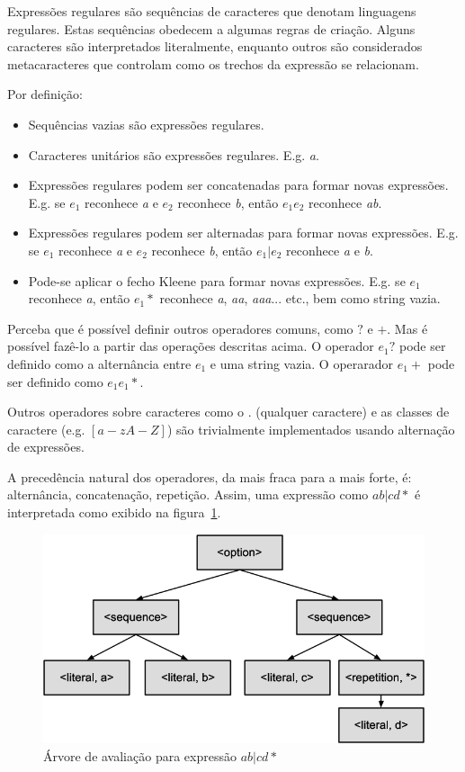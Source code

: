 \documentclass[a4paper,12pt,oneside,onecolumn]{uerj}
\begin{document}
Expressões regulares são sequências de caracteres que denotam linguagens regulares. Estas sequências obedecem a algumas regras de criação. Alguns caracteres são interpretados literalmente, enquanto outros são considerados metacaracteres que controlam como os trechos da expressão se relacionam.

Por definição:

\begin{itemize}
    \item Sequências vazias são expressões regulares.
    \item Caracteres unitários são expressões regulares. E.g. \emph{a}.
    \item Expressões regulares podem ser concatenadas para formar novas expressões. E.g. se $e_1$ reconhece \emph{a} e $e_2$ reconhece \emph{b}, então $e_1e_2$ reconhece \emph{ab}.
    \item Expressões regulares podem ser alternadas para formar novas expressões. E.g. se $e_1$ reconhece \emph{a} e $e_2$ reconhece \emph{b}, então $e_1|e_2$ reconhece \emph{a} e \emph{b}.
    \item Pode-se aplicar o fecho Kleene para formar novas expressões. E.g. se $e_1$ reconhece \emph{a}, então $e_1*$ reconhece \emph{a}, \emph{aa}, \emph{aaa}... etc., bem como string vazia.
\end{itemize}

Perceba que é possível definir outros operadores comuns, como $?$ e $+$. Mas é possível fazê-lo a partir das operações descritas acima. O operador $e_1?$ pode ser definido como a alternância entre $e_1$ e uma string vazia. O operarador $e_1+$ pode ser definido como $e_1e_1*$.

Outros operadores sobre caracteres como o $.$ (qualquer caractere) e as classes de caractere (e.g. $[a-zA-Z]$) são trivialmente implementados usando alternação de expressões.

A precedência natural dos operadores, da mais fraca para a mais forte, é: alternância, concatenação, repetição. Assim, uma expressão como $ab|cd*$ é interpretada como exibido na figura~\ref{fig:abcd_parse_tree}.

\begin{figure}[!htbp]
  \centering
  \includegraphics[scale=0.4]{figures/abcd_parse_tree.png}
  \caption{Árvore de avaliação para expressão $ab|cd*$}
  \label{fig:abcd_parse_tree}
\end{figure}
\end{document}
